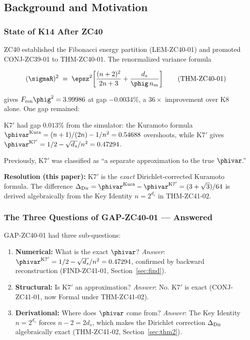 \documentclass[12pt, a4paper]{article}
\begin{document}
\bigskip

\subsection{Background and Motivation}
\label{sec:background}

\subsubsection{State of K14 After ZC40}

ZC40 established the Fibonacci energy partition (LEM-ZC40-01) and
promoted CONJ-ZC39-01 to THM-ZC40-01.
The renormalized variance formula

\[
  (\sigmaR)^2
  \;=\; \epsz^2\!\left[\frac{(n+2)^2}{2n+3}
        + \frac{d_s}{\phig\,n_m}\right]
  \tag{THM-ZC40-01}
\]

gives $F_{\rm ren}\phig^2 = 3.99986$ at gap $-0.0034\%$,
a $36{\times}$ improvement over K8 alone.
One gap remained:

\begin{openqbox}[title={GAP-ZC40-01 (Inherited) --- \textit{Closed
  in This Paper}}]
K7$'$ had gap $0.013\%$ from the simulator: the Kuramoto formula
$\phivar^{\rm Kura} = (n+1)/(2n) - 1/n^2 = 0.54688$ overshoots,
while K7$'$ gives $\phivar^{\rm K7'} = 1/2 - \sqrt{d_s}/n^2 = 0.47294$.

Previously, K7$'$ was classified as ``a separate approximation
to the true $\phivar$.''

\textbf{Resolution (this paper):}
K7$'$ is the \emph{exact} Dirichlet-corrected Kuramoto formula.
The difference $\Delta_{\rm Dir} = \phivar^{\rm Kura} - \phivar^{\rm K7'}
= (3+\sqrt{3})/64$ is derived algebraically from the Key Identity
$n = 2^{d_s}$ in THM-ZC41-02.
\end{openqbox}

\subsubsection{The Three Questions of GAP-ZC40-01 --- Answered}

GAP-ZC40-01 had three sub-questions:
\begin{enumerate}[leftmargin=2em, noitemsep]
  \item \textbf{Numerical:} What is the exact $\phivar$?
    \emph{Answer}: $\phivar^{\rm K7'} = 1/2 - \sqrt{d_s}/n^2 = 0.47294$,
    confirmed by backward reconstruction (FIND-ZC41-01,
    Section~\ref{sec:find}).
  \item \textbf{Structural:} Is K7$'$ an approximation?
    \emph{Answer}: No. K7$'$ is exact (CONJ-ZC41-01, now Formal
    under THM-ZC41-02).
  \item \textbf{Derivational:} Where does $\phivar$ come from?
    \emph{Answer}: The Key Identity $n = 2^{d_s}$ forces
    $n-2 = 2d_s$, which makes the Dirichlet correction
    $\Delta_{\rm Dir}$ algebraically exact (THM-ZC41-02,
    Section~\ref{sec:thm2}).
\end{enumerate}
\end{document}
